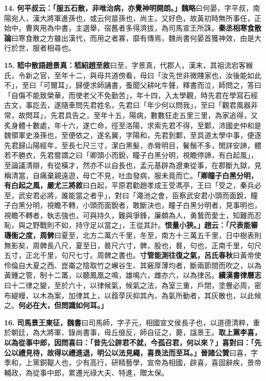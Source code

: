 \textbf{14.} \textbf{何平叔云：「服五石散，非唯治病，亦覺神明開朗。」}{\footnotesize \textbf{魏略}曰何晏，字平叔，南陽宛人，漢大將軍進孫也，或云何苗孫也，尚主，又好色，故黃初時無所事任，正始中，曹爽用為中書，主選舉，宿舊者多得濟拔，為司馬宣王所誅。\textbf{秦丞相寒食散論}曰寒食散之方雖出漢代，而用之者寡，靡有傳焉，魏尚書何晏首獲神效，由是大行於世，服者相尋也。}

\textbf{15.} \textbf{嵇中散語趙景真：}{\footnotesize \textbf{嵇紹趙至敘}曰至，字景真，代郡人，漢末，其祖流宕客緱氏，令新之官，至年十二，與母共道傍看，母曰「汝先世非微賤家也，汝後能如此不」，至曰「可爾耳」，歸便求師誦書，蚤聞父耕叱牛聲，釋書而泣，師問之，答曰「自傷不能致榮華，而使老父不免勤苦」，年十四，入太學觀，時先君在學寫石經古文，事訖去，遂隨車問先君姓名，先君曰「年少何以問我」，至曰「觀君風器非常，故問耳」，先君具告之，至年十五，陽病，數數狂走五里三里，為家追得，又炙身體十數處，年十六，遂亡命，徑至洛陽，求索先君不得，至鄴，沛國史仲和是魏領軍史渙孫也，至便依之，遂名翼，字陽和，先君到鄴，至具道太學中事，便逐先君歸山陽經年，至長七尺三寸，潔白黑髮，赤脣明目，鬢鬚不多，閒詳安諦，體若不勝衣，先君嘗謂之曰「卿頭小而銳，瞳子白黑分明，視瞻停諦，有白起風」，至論議清辯，有從橫才，然亦不以自長也，孟元基辟為遼東從事，在郡斷九獄，見稱清當，自痛棄親遠遊，母亡不見，吐血發病，服未竟而亡。}\textbf{「卿瞳子白黑分明，有白起之風，}{\footnotesize \textbf{嚴尤三將敘}曰白起，平原君勸趙孝成王受馮亭，王曰「受之，秦兵必至，武安君必將，誰能當之者乎」，對曰「澠池之會，臣察武安君小頭而面銳，瞳子白黑分明，視瞻不轉，小頭而面銳者，敢斷決也，瞳子白黑分明者，見事明也，視瞻不轉者，執志強也，可與持久，難與爭鋒，廉頗為人，勇鷙而愛士，知難而忍恥，與之野戰則不如，持守足以當之」，王從其計。}\textbf{恨量小狹。」趙云：「尺表能審璣衡之度，}{\footnotesize \textbf{周髀}曰夏至，北方二萬六千里，冬至，南方十三萬五千里，日中樹表則無影矣，周髀長八尺，夏至日，晷尺六寸，髀，股也，晷，句也，正南千里，句尺五寸，正北千里，句尺七寸。周髀之書也。}\textbf{寸管能測往復之氣，}{\footnotesize \textbf{呂氏春秋}曰黃帝使伶倫自大夏之西、崑崙之陰取竹之嶰谷生、其竅厚薄均者，斷兩節間而吹之，以為黃鍾之管，制十二筩，以聽鳳凰之鳴，雄鳴六，雌亦六，以為律呂。\textbf{續漢書律曆志}曰十二律之變，至於六十，以律候氣，候氣之法，為室三重，戶閉，塗釁必周，密布緹幔，以木為案，加律其上，以葭莩灰抑其內，為氣所動者，其灰散也，以此候之。}\textbf{何必在大，但問識如何耳。」}

\textbf{16.} \textbf{司馬景王東征，}{\footnotesize \textbf{魏書}曰司馬師，字子元，相國宣文侯長子也，以道德清粹，重於朝廷，為大將軍、錄尚書事，毋丘儉反，師自征之，薨，諡景王。}\textbf{取上黨李喜，以為從事中郎，因問喜曰：「昔先公辟君不就，今孤召君，何以來？」喜對曰：「先公以禮見待，故得以禮進退，明公以法見繩，喜畏法而至耳。」}{\footnotesize \textbf{晉諸公贊}曰喜，字季和，上黨銅鞮人也，少有高行，研精藝學，宣帝為相國，辟喜，喜固辭疾，景帝輔政，為從事中郎，累遷光祿大夫、特進，贈太保。}

